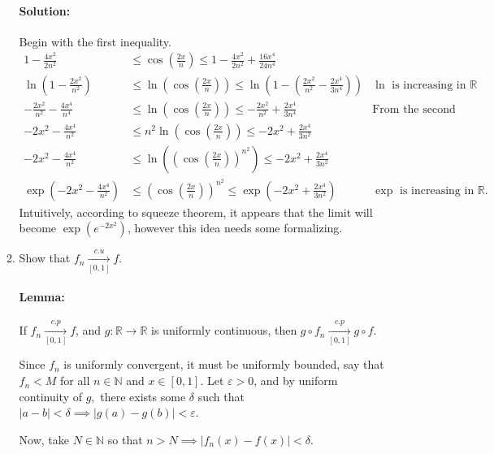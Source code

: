 \documentclass{article}
\begin{document}
\begin{enumerate}
\begin{enumerate}
        \paragraph{Solution: }Begin with the first inequality. 
        \begin{align*}
            1-\frac{4x^2}{2n^2}&\leq \cos \left(   \frac{2x}{n}\right)\leq 1-\frac{4x^2}{2n^2}+\frac{16x^4}{24n^{4}}\\
            \ln\left(  1-\frac{2x^2}{n^2}\right) &\leq\ln \left(  \cos \left(   \frac{2x}{n}\right)\right) \leq\ln\left( 1-\left( \frac{2x^2}{n^2}-\frac{2 x^4}{3n^{4}}\right)  \right) &\ln\text{ is increasing in }\mathbb{R}\\
            -\frac{2x^2}{n^2}-\frac{4x^4}{n^4}&\leq \ln \left(  \cos \left(   \frac{2x}{n}\right)\right)\leq-\frac{2x^2}{n^2}+\frac{2x^4}{3n^{4}}&\text{From the second inequality}\\
            -{2x^2}-\frac{4x^4}{n^2}&\leq n^2 \ln \left(  \cos \left(   \frac{2x}{n}\right)\right)\leq{-2x^2}+\frac{2x^4}{3n^{2}}\\
            -{2x^2}-\frac{4x^4}{n^2}&\leq \ln \left( \left( \cos \left(   \frac{2x}{n}\right)\right)^{n^2}\right)\leq{-2x^2}+\frac{2x^4}{3n^{2}}\\
            \exp\left( -{2x^2}-\frac{4x^4}{n^2} \right) &\leq \left( \cos \left(   \frac{2x}{n}\right)\right)^{n^2}\leq\exp\left( -{2x^2}+\frac{2x^4}{3n^{2}} \right) &\exp\text{ is increasing in }\mathbb{R}
        .\end{align*}
        Intuitively, according to squeeze theorem, it appears that the limit will become $\exp\left( e^{-2x^2} \right) $, however this idea needs some formalizing.
    \item Show that $f_n\xrightarrow[{[0,1]}]{c.u}f$.
        \paragraph{Lemma:} If $ f_n\xrightarrow[{[0,1]}]{c.p}f$, and $g:\mathbb{R}\to \mathbb{R}$ is uniformly continuous, then $ g\circ f_n\xrightarrow[{[0,1]}]{c.p}g\circ f$.

        Since $f_n$ is uniformly convergent, it must be uniformly bounded, say that $f_n<M$ for all $n\in \mathbb{N}$ and $x\in [0,1]$. Let $\varepsilon>0$, and by uniform continuity of $g,$ there exists some $\delta$ such that $|a-b|<\delta\implies|g(a)-g(b)|<\varepsilon$.

        Now, take $N\in \mathbb{N}$ so that $n>N\implies|f_n(x)-f(x)|<\delta$.


\end{enumerate}
\end{enumerate}
\end{document}
